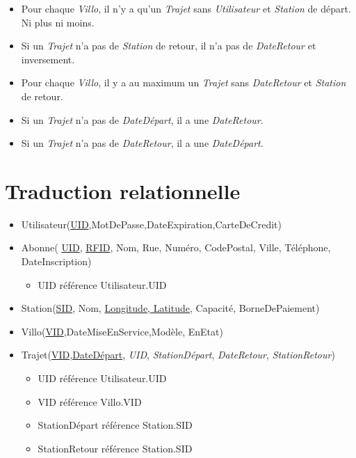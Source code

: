 \documentclass[a4paper, 12pt]{report}
\begin{document}
\begin{itemize}
		\item Pour chaque \textit{Villo}, il n'y a qu'un \textit{Trajet} sans \textit{Utilisateur} et \textit{Station} de départ. Ni plus ni moins.
		\item Si un \textit{Trajet} n'a pas de \textit{Station} de retour, il n'a pas de \textit{DateRetour} et inversement.
		
		\item Pour chaque \textit{Villo},  il y a au maximum un \textit{Trajet} sans \textit{DateRetour} et \textit{Station} de retour.
		
		\item Si un \textit{Trajet} n'a pas de \textit{DateDépart}, il a une \textit{DateRetour}.
		
		\item Si un \textit{Trajet} n'a pas de \textit{DateRetour}, il a une \textit{DateDépart}.
		
	\end{itemize}

\section*{Traduction relationnelle} %
	
	\begin{itemize}
	
		\item Utilisateur(\underline{UID},MotDePasse,DateExpiration,CarteDeCredit)
		
		\item Abonne( \underline{UID}, \underline{RFID}, Nom, Rue, Numéro, CodePostal, Ville, Téléphone, DateInscription)
		
		\begin{itemize}
			\item UID référence Utilisateur.UID
		\end{itemize}
		
		\item Station(\underline{SID}, Nom, \underline{Longitude, Latitude}, Capacité, BorneDePaiement)
		
		\item Villo(\underline{VID},DateMiseEnService,Modèle, EnEtat)
		
		\item Trajet(\underline{VID,DateDépart}, \textit{UID}, \textit{StationDépart}, \textit{DateRetour}, \textit{StationRetour})
		
		\begin{itemize}
			\item UID référence Utilisateur.UID
			\item VID référence Villo.VID
			\item StationDépart référence Station.SID
			\item StationRetour référence Station.SID
		\end{itemize}
		
	\end{itemize}
	
\end{document}
